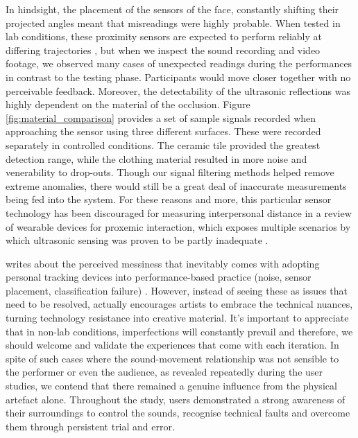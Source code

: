 In hindsight, the placement of the sensors of the face, constantly shifting their projected angles meant that misreadings were highly probable. When tested in lab conditions, these proximity sensors are expected to perform reliably at differing trajectories \citep{abreu_low-cost_2021}, but when we inspect the sound recording and video footage, we observed many cases of unexpected readings during the performances in contrast to the testing phase. Participants would move closer together with no perceivable feedback. Moreover, the detectability of the ultrasonic reflections was highly dependent on the material of the occlusion. Figure \ref{fig:material_comparison} provides a set of sample signals recorded when approaching the sensor using three different surfaces. These were recorded separately in controlled conditions. The ceramic tile provided the greatest detection range, while the clothing material resulted in more noise and venerability to drop-outs. Though our signal filtering methods helped remove extreme anomalies, there would still be a great deal of inaccurate measurements being fed into the system. For these reasons and more, this particular sensor technology has been discouraged for measuring interpersonal distance in a review of wearable devices for proxemic interaction, which exposes multiple scenarios by which ultrasonic sensing was proven to be partly inadequate \citep{montanari_measuring_2018}.

\citeauthor{fdili_alaoui_making_2019} writes about the perceived messiness that inevitably comes with adopting personal tracking devices into performance-based practice (noise, sensor placement, classification failure) \cite{fdili_alaoui_making_2019}. However, instead of seeing these as issues that need to be resolved, actually encourages artists to embrace the technical nuances, turning technology resistance into creative material. It's important to appreciate that in non-lab conditions, imperfections will constantly prevail and therefore, we should welcome and validate the experiences that come with each iteration. In spite of such cases where the sound-movement relationship was not sensible to the performer or even the audience, as revealed repeatedly during the user studies, we contend that there remained a genuine influence from the physical artefact alone. Throughout the study, users demonstrated a strong awareness of their surroundings to control the sounds, recognise technical faults and overcome them through persistent trial and error.

